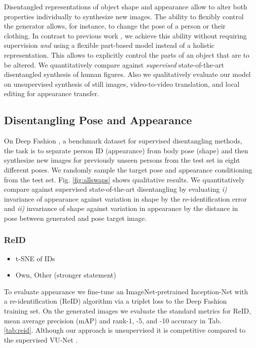 	Disentangled representations of object shape and appearance allow to alter both properties individually to synthesize new images. The ability to flexibly control the generator allows, for instance, to change the pose of a person or their clothing. In contrast to previous work \cite{esser18, denton17disvideo, ma17poseguided, ma17disperson, debem18dgpose, jakab18},
	we achieve this ability without requiring supervision \textit{and} using a flexible part-based model instead of a holistic representation. This allows to explicitly control the parts of an object that are to be altered. We quantitatively compare against \emph{supervised} state-of-the-art disentangled synthesis of human figures. Also we qualitatively evaluate our model on unsupervised synthesis of still images, video-to-video translation, and local editing for appearance transfer.


	\subsection{Disentangling Pose and Appearance}

	On Deep Fashion \cite{liu16deepfashion, liu16deepfashionwild}, a benchmark dataset for supervised disentangling methods, the task is to separate person ID (appearance) from body pose (shape) and then synthesize new images for previously unseen persons from the test set in eight different poses. We randomly sample the target pose and appearance conditioning from the test set. Fig. \ref{fig:allswaps} shows qualitative results.
	We quantitatively compare against supervised state-of-the-art disentangling \cite{esser18} by evaluating \emph{i)} invariance of appearance against variation in shape by the re-identification error and \emph{ii)} invariance of shape against variation in appearance by the distance in pose between generated and pose target image.

	\subsubsection{ReID}
	\begin{itemize}
		\item t-SNE of IDs
		\item Own, Other (stronger statement)
	\end{itemize}
	To evaluate appearance we fine-tune an ImageNet-pretrained \cite{russakovsky15imagenet} Inception-Net \cite{szegedy15inception} with a re-identification (ReID) algorithm \cite{xiao17reidjoint} via a triplet loss \cite{hermans17reidtriplet} to the Deep Fashion training set.
	On the generated images we evaluate the standard metrics for ReID, mean average precision (mAP) and rank-1, -5, and -10 accuracy in Tab. \ref{tab:reid}.
	Although our approach is unsupervised it is competitive compared to the supervised VU-Net \cite{esser18}.


